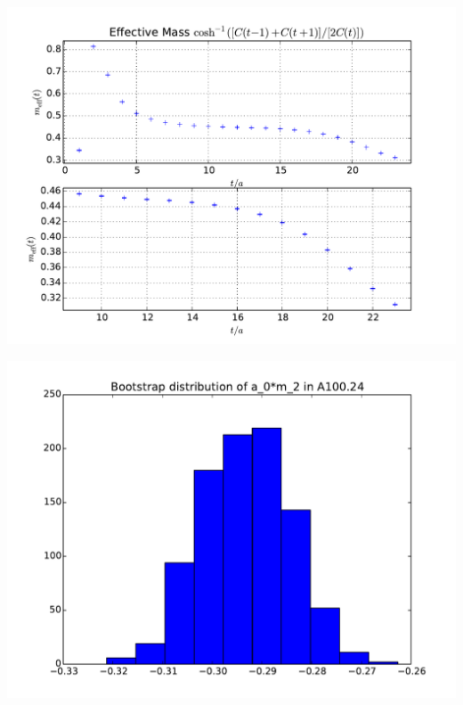 \documentclass[english, fleqn]{beamer}
\begin{document}
\begin{frame}
    \begin{centering}
        \includegraphics[height=\textheight]{plots/A100_24_L24_T48_beta190_mul0100_musig150_mudel190_kappa1632550__ev120__TB2_SO_LI6_new_c4_m_eff.pdf}
    \end{centering}
\end{frame}

\begin{frame}
    \begin{centering}
        \includegraphics[height=\textheight]{plots/A100_24_L24_T48_beta190_mul0100_musig150_mudel190_kappa1632550__ev120__TB2_SO_LI6_new_boot-hist_a_0*m_2.pdf}
    \end{centering}
\end{frame}
\end{document}
